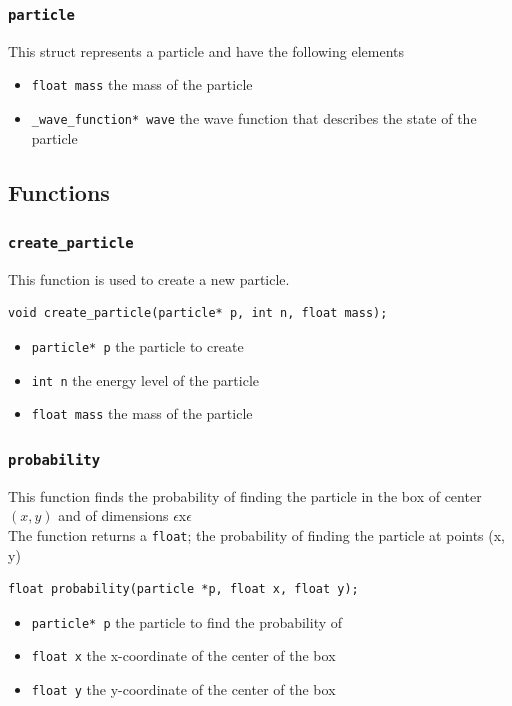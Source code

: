 \documentclass[a4paper, 10pt]{article}
\begin{document}
        \subsubsection{\texttt{particle}}
        This struct represents a particle and have the following elements
        \begin{itemize}
            \item \texttt{float mass} the mass of the particle
            \item \texttt{\_wave\_function* wave} the wave function that describes the state of
                  the particle
        \end{itemize}

    \subsection{Functions}
        \subsubsection{\texttt{create\_particle}}
        This function is used to create a new particle.
        \begin{verbatim}
void create_particle(particle* p, int n, float mass);
        \end{verbatim}
        \begin{itemize}
            \item \texttt{particle* p} the particle to create
            \item \texttt{int n} the energy level of the particle
            \item \texttt{float mass} the mass of the particle
        \end{itemize}
        \subsubsection{\texttt{probability}}
        This function finds the probability of finding the particle in the box of center $(x, y)$
        and of dimensions $\epsilon$x$\epsilon$\\
        The function returns a \texttt{float}; the probability of finding the particle at points (x, y)
        \begin{verbatim}
float probability(particle *p, float x, float y);
        \end{verbatim}
        \begin{itemize}
            \item \texttt{particle* p} the particle to find the probability of
            \item \texttt{float x} the x-coordinate of the center of the box 
            \item \texttt{float y} the y-coordinate of the center of the box
        \end{itemize}
\end{document}
